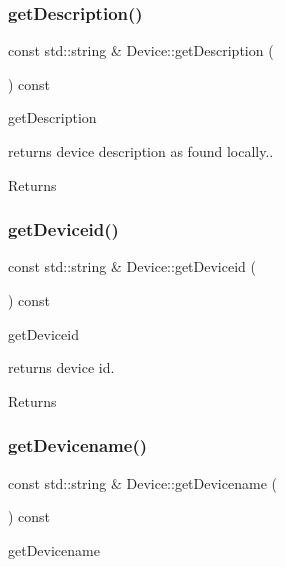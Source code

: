 \subsubsection{\texorpdfstring{get\+Description()}{getDescription()}}
{\footnotesize\ttfamily const std\+::string \& Device\+::get\+Description (\begin{DoxyParamCaption}{ }\end{DoxyParamCaption}) const}



get\+Description 

returns device description as found locally.. \begin{DoxyReturn}{Returns}

\end{DoxyReturn}
\mbox{\label{classDevice_ace938c6c2efffdcc2d17d49440cb55b7}} 
\subsubsection{\texorpdfstring{get\+Deviceid()}{getDeviceid()}}
{\footnotesize\ttfamily const std\+::string \& Device\+::get\+Deviceid (\begin{DoxyParamCaption}{ }\end{DoxyParamCaption}) const}



get\+Deviceid 

returns device id. \begin{DoxyReturn}{Returns}

\end{DoxyReturn}
\mbox{\label{classDevice_a7c1221950b9ec064b023c4033454774a}} 
\subsubsection{\texorpdfstring{get\+Devicename()}{getDevicename()}}
{\footnotesize\ttfamily const std\+::string \& Device\+::get\+Devicename (\begin{DoxyParamCaption}{ }\end{DoxyParamCaption}) const}



get\+Devicename 

